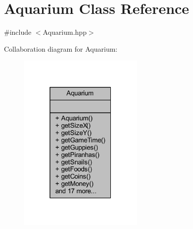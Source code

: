 \hypertarget{class_aquarium}{}\section{Aquarium Class Reference}
\label{class_aquarium}


{\ttfamily \#include $<$Aquarium.\+hpp$>$}



Collaboration diagram for Aquarium\+:\nopagebreak
\begin{figure}[H]
\begin{center}
\leavevmode
\includegraphics[width=172pt]{class_aquarium__coll__graph}
\end{center}
\end{figure}
